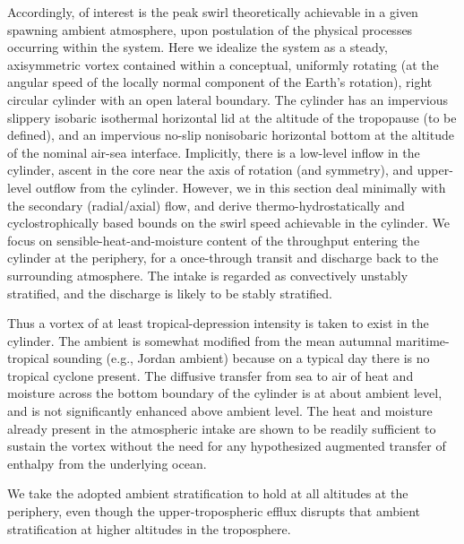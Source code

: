 \documentclass[preprint, prX]{revtex4}
\begin{document}
Accordingly, of interest is the peak swirl theoretically achievable in a given spawning ambient atmosphere, upon postulation of the physical processes occurring within the system. Here we idealize the system as a steady, axisymmetric vortex contained within a conceptual, uniformly rotating (at the angular speed of the locally normal component of the Earth's rotation), right circular cylinder with an open lateral boundary. The cylinder has an impervious slippery isobaric isothermal horizontal lid at the altitude of the tropopause (to be defined), and an impervious no-slip nonisobaric horizontal bottom at the altitude of the nominal air-sea interface. Implicitly, there is a low-level inflow in the cylinder, ascent in the core near the axis of rotation (and symmetry), and upper-level outflow from the cylinder. However, we in this section deal minimally with the secondary (radial/axial) flow, and derive thermo-hydrostatically and cyclostrophically based bounds on the swirl speed achievable in the cylinder. We focus on sensible-heat-and-moisture content of the throughput entering the cylinder at the periphery, for a once-through transit and discharge back to the surrounding atmosphere. The intake is regarded as convectively unstably stratified, and the discharge is likely to be stably stratified.

Thus a vortex of at least tropical-depression intensity is taken to exist in the cylinder. The ambient is somewhat modified from the mean autumnal maritime-tropical sounding (e.g., Jordan ambient) because on a typical day there is no tropical cyclone present. The diffusive transfer from sea to air of heat and moisture across the bottom boundary of the cylinder is at about ambient level, and is not significantly enhanced above ambient level. The heat and moisture already present in the atmospheric intake are shown to be readily sufficient to sustain the vortex without the need for any hypothesized augmented transfer of enthalpy from the underlying ocean.

We take the adopted ambient stratification to hold at all altitudes at the periphery, even though the upper-tropospheric efflux disrupts that ambient stratification at higher altitudes in the troposphere.
\end{document}
